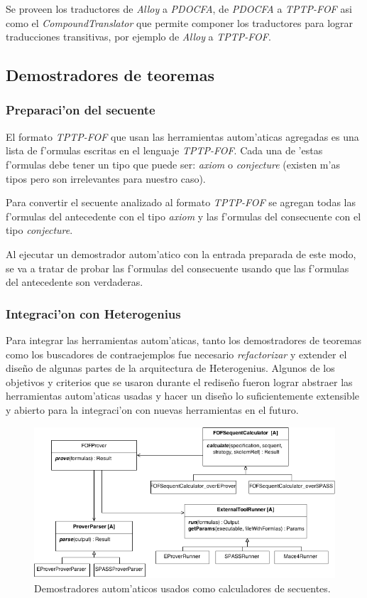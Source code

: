 Se proveen los traductores de \textit{Alloy} a \textit{PDOCFA}, de \textit{PDOCFA} a \textit{TPTP-FOF} asi como el \textit{CompoundTranslator} que permite componer los traductores para lograr traducciones transitivas, por ejemplo de \textit{Alloy} a \textit{TPTP-FOF}.


\subsection{Demostradores de teoremas}

\subsubsection{Preparaci'on del secuente}

El formato \textit{TPTP-FOF} que usan las herramientas autom'aticas agregadas es una lista de f'ormulas escritas en el lenguaje \textit{TPTP-FOF}. Cada una de 'estas f'ormulas debe tener un tipo que puede ser: \textit{axiom} o \textit{conjecture} (existen m'as tipos pero son irrelevantes para nuestro caso).

Para convertir el secuente analizado al formato \textit{TPTP-FOF} se agregan todas las f'ormulas del antecedente con el tipo \textit{axiom} y las f'ormulas del consecuente con el tipo \textit{conjecture}. 

Al ejecutar un demostrador autom'atico con la entrada preparada de este modo, se va a tratar de probar las f'ormulas del consecuente usando que las f'ormulas del antecedente son verdaderas.


\subsubsection{Integraci'on con Heterogenius}

Para integrar las herramientas autom'aticas, tanto los demostradores de teoremas como los buscadores de contraejemplos fue necesario \textit{refactorizar} y extender el diseño de algunas partes de la arquitectura de Heterogenius. Algunos de los objetivos y criterios que se usaron durante el rediseño fueron lograr abstraer las herramientas autom'aticas usadas y hacer un diseño lo suficientemente extensible y abierto para la integraci'on con nuevas herramientas en el futuro.

\begin{figure}[]
	\includegraphics[width=450px, angle=90]{img/arq_prover.png}
	\centering
	\caption{Demostradores autom'aticos usados como calculadores de secuentes.}
	\label{fofproverdiagrama}
\end{figure}

